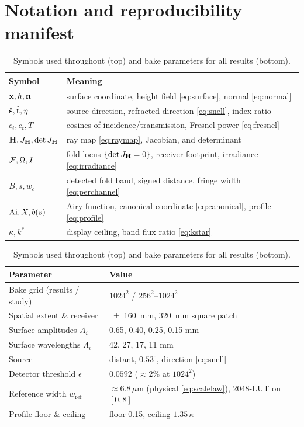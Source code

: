 \section{Notation and reproducibility manifest}
\label{app:notation}
\label{app:manifest}

\begin{table}[htbp]
\centering
\caption{Symbols used throughout (top) and bake parameters for all results (bottom).}
\label{tab:notation}
\label{tab:manifest}
\footnotesize
\setlength{\tabcolsep}{3pt}
\renewcommand{\arraystretch}{0.92}
\begin{tabular}{@{}ll@{}}
\toprule
Symbol & Meaning \\
\midrule
$\mathbf{x}, h, \mathbf{n}$ & surface coordinate, height field \eqref{eq:surface}, normal \eqref{eq:normal} \\
$\hat{\mathbf{s}}, \hat{\mathbf{t}}, \eta$ & source direction, refracted direction \eqref{eq:snell}, index ratio \\
$c_i, c_t, T$ & cosines of incidence/transmission, Fresnel power \eqref{eq:fresnel} \\
$\mathbf{H}, J_{\mathbf{H}}, \det J_{\mathbf{H}}$ & ray map \eqref{eq:raymap}, Jacobian, and determinant \\
$\mathcal{F}, \Omega, I$ & fold locus $\{\det J_{\mathbf{H}} = 0\}$, receiver footprint, irradiance \eqref{eq:irradiance} \\
$B, s, w_c$ & detected fold band, signed distance, fringe width \eqref{eq:perchannel} \\
$\operatorname{Ai}, X, b(s)$ & Airy function, canonical coordinate \eqref{eq:canonical}, profile \eqref{eq:profile} \\
$\kappa, k^{*}$ & display ceiling, band flux ratio \eqref{eq:kstar} \\
\bottomrule
\end{tabular}
\vspace{0.5em}

\begin{tabular}{@{}ll@{}}
\toprule
Parameter & Value \\
\midrule
Bake grid (results / study) & $1024^2$ / $256^2$--$1024^2$ \\
Spatial extent \& receiver  & \SI{\pm 160}{\milli\meter}, \SI{320}{\milli\meter} square patch \\
Surface amplitudes $A_i$    & \num{0.65}, \num{0.40}, \num{0.25}, \num{0.15} \si{\milli\meter} \\
Surface wavelengths $\Lambda_i$ & 42, 27, 17, 11 \si{\milli\meter} \\
Source & distant, $0.53^\circ$, direction \eqref{eq:snell} \\
Detector threshold $\epsilon$ & $\num{0.0592}$ ($\approx 2\%$ at $1024^2$) \\
Reference width $w_{\text{ref}}$ & $\approx 6.8\,\mu\text{m}$ (physical \eqref{eq:scalelaw}), 2048-LUT on $[0,8]$ \\
Profile floor \& ceiling & floor \num{0.15}, ceiling $1.35\,\kappa$ \\
\bottomrule
\end{tabular}
\end{table}

